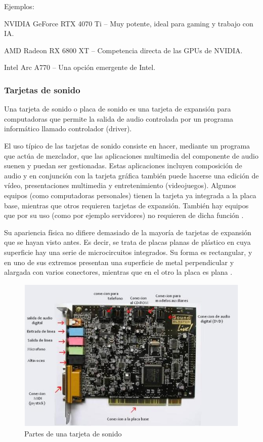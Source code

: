 Ejemplos:

NVIDIA GeForce RTX 4070 Ti – Muy potente, ideal para gaming y trabajo con IA.

AMD Radeon RX 6800 XT – Competencia directa de las GPUs de NVIDIA.

Intel Arc A770 – Una opción emergente de Intel.

\subsubsection{Tarjetas de sonido}

Una tarjeta de sonido o placa de sonido es una tarjeta de expansión para computadoras que permite la salida de audio controlada por un programa informático llamado controlador (driver).

El uso típico de las tarjetas de sonido consiste en hacer, mediante un programa que actúa de mezclador, que las aplicaciones multimedia del componente de audio suenen y puedan ser gestionadas. Estas aplicaciones incluyen composición de audio y en conjunción con la tarjeta gráfica también puede hacerse una edición de vídeo, presentaciones multimedia y entretenimiento (videojuegos). Algunos equipos (como computadoras personales) tienen la tarjeta ya integrada a la placa base, mientras que otros requieren tarjetas de expansión. También hay equipos que por su uso (como por ejemplo servidores) no requieren de dicha función \cite{tuhome}.

Su apariencia física no difiere demasiado de la mayoría de tarjetas de expansión que se hayan visto antes. Es decir, se trata de placas planas de plástico en cuya superficie hay una serie de microcircuitos integrados. Su forma es rectangular, y en uno de sus extremos presentan una superficie de metal perpendicular y alargada con varios conectores, mientras que en el otro la placa es plana \cite{conceptarjsond}.

\begin{figure}[H]
  \centering
  \includegraphics[scale=0.8]{imagenes/tarjeta-sonido.png}
  \caption{Partes de una tarjeta de sonido}
\end{figure}

